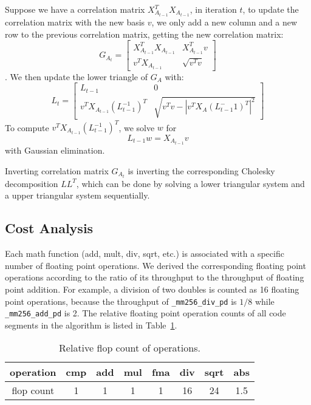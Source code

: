 Suppose we have a correlation matrix $X_{A_{t-1}}^T X_{A_{t-1}}$, in iteration $t$, to update the correlation matrix with the new basis $v$, we only add a new column and a new row to the previous correlation matrix, getting the new correlation matrix:
\[
G_{A_t} = 
\begin{bmatrix}
X_{A_{t-1}}^T X_{A_{t-1}}   &   X_{A_{t-1}}^T v \\
v^T X_{A_{t-1}}             &   \sqrt{v^T v}
\end{bmatrix}
\].
We then update the lower triangle of $G_A$ with:
\[
L_t = 
\begin{bmatrix}
L_{t-1}   &    0 \\
v^T X_{A_{t-1}} (L_{t-1}^{-1})^T  &  \sqrt{v^T v - |v^T X_A (L_{t-1}^-1)^T | ^2}
\end{bmatrix}
\]
To compute $v^T X_{A_{t-1}} (L_{t-1}^{-1})^T$, we solve $w$ for
$$
L_{t-1} w = X_{A_{t-1}} v
$$ with Gaussian elimination. 

Inverting correlation matrix $G_{A_t}$ is inverting the corresponding Cholesky decomposition $LL^T$, which can be done by solving a lower triangular system and a upper triangular system sequentially. 



\subsection{Cost Analysis}
\label{ssec:cost-analysis}
Each math function (add, mult, div, sqrt, etc.) is associated with a specific number of floating point operations.
We derived the corresponding floating point operations according to the ratio of its throughput to the throughput of floating point addition.
For example, a division of two doubles is counted as 16 floating point operations, because the throughput of \texttt{\_mm256\_div\_pd} is $1/8$ while \texttt{\_mm256\_add\_pd} is 2\cite{Intrinsics}.
The relative floating point operation counts of all code segments in the algorithm is listed in Table~\ref{tab:flop_def}.
 
\begin{table}
\centering
\begin{tabular}{|c||c|c|c|c|c|c|c|}
\hline
operation & cmp & add & mul & fma & div & sqrt & abs \\ \hline
flop count & 1 & 1 & 1 & 1 & 16 & 24 & 1.5 \\ \hline
\end{tabular}
\caption{Relative flop count of operations.}
\label{tab:flop_def}
\end{table}

